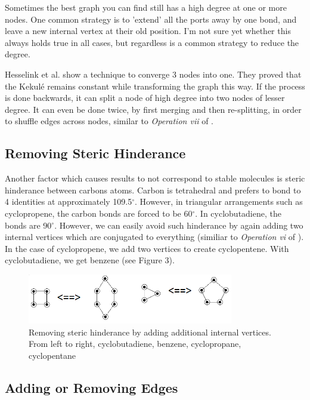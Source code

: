 \documentclass[12pt]{article}
\begin{document}
Sometimes the best graph you can find still has a high degree at one or more nodes. One common strategy is to 'extend' all the ports away by one bond, and leave a new internal vertex at their old position. I'm not sure yet whether this always holds true in all cases, but regardless is a common strategy to reduce the degree. 

Hesselink et al. \cite{HH13} show a technique to converge 3 nodes into one. They proved that the Kekul\'{e} remains constant while transforming the graph this way. If the process is done backwards, it can split a node of high degree into two nodes of lesser degree. It can even be done twice, by first merging and then re-splitting, in order to shuffle edges across nodes, similar to \textit{Operation vii} of \cite{v06}. 

\subsection{Removing Steric Hinderance}

Another factor which causes results to not correspond to stable molecules is
steric hinderance between carbons atoms. Carbon is tetrahedral and prefers to bond to 4 identities at approximately 109.5$^\circ$. However, in triangular arrangements such as cyclopropene, the carbon bonds are forced to be 60$^\circ$. In cyclobutadiene, the bonds are 90$^\circ$. However, we can easily avoid such hinderance by again adding  two internal vertices which are conjugated to everything (similiar to \textit{Operation vi} of \cite{v06}). In the case of cyclopropene, we add two vertices to create cyclopentene. With cyclobutadiene, we get benzene (see Figure 3).

\begin{figure}[ht!]
\centering
\includegraphics[width=90mm]{bad.png}
\caption{ Removing steric hinderance by adding additional internal vertices. From left to right, cyclobutadiene, benzene, cyclopropane, cyclopentane}
\end{figure}

\subsection{Adding or Removing Edges}
\end{document}
